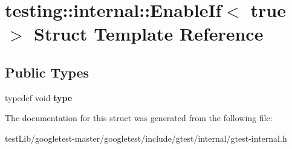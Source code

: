 \hypertarget{structtesting_1_1internal_1_1EnableIf_3_01true_01_4}{}\section{testing\+:\+:internal\+:\+:Enable\+If$<$ true $>$ Struct Template Reference}
\label{structtesting_1_1internal_1_1EnableIf_3_01true_01_4}
\subsection*{Public Types}
\begin{DoxyCompactItemize}
\item 
\mbox{\label{structtesting_1_1internal_1_1EnableIf_3_01true_01_4_a9398d803f1fdd99ff41823746f6299ff}} 
typedef void {\bfseries type}
\end{DoxyCompactItemize}


The documentation for this struct was generated from the following file\+:\begin{DoxyCompactItemize}
\item 
test\+Lib/googletest-\/master/googletest/include/gtest/internal/gtest-\/internal.\+h\end{DoxyCompactItemize}
